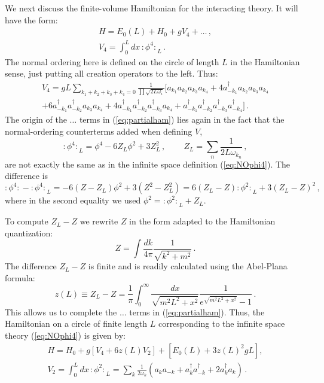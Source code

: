 \documentclass[11pt]{article}
\newcommand{\reef}[1]{(\ref{#1})}
\newcommand{\beq}{\begin{equation}}
\newcommand{\eeq}{\end{equation}}
\newcommand{\NO}[1]{{:\!#1\!:}}
\numberwithin{equation}{section}
\begin{document}
We next discuss the finite-volume Hamiltonian for the interacting theory. It will have the form:
\begin{gather}
\label{eq:partialham}
H = E_0(L)+ H_0+ g V_4+\ldots\,,\\
V_4=\int_0^L dx\,\NO{\phi^4}_L\,. 
\end{gather}
The normal ordering here is defined on the circle of length $L$ in the Hamiltonian sense, just putting all creation operators to the left. Thus:
\begin{multline}
V_4 = g L \sum_{k_1+k_2+k_3+k_4=0} \frac{1}{\prod \sqrt{2 L \omega_i}}
\Big[ a_{k_1}a_{k_2}a_{k_3}a_{k_4} +
4 a^\dagger_{-k_1}a_{k_2}a_{k_3}a_{k_4} \\ +
6 a^\dagger_{-k_1}a^\dagger_{-k_2}a_{k_3}a_{k_4} 
 +4 a^\dagger_{-k_1}a^\dagger_{-k_2}a^\dagger_{-k_3}a_{k_4} 
+ a^\dagger_{-k_1}a^\dagger_{-k_2}a^\dagger_{-k_3}a^\dagger_{-k_4} 
\Big]\,.
\end{multline}
The origin of the $\ldots$ terms in \reef{eq:partialham} lies again in the fact that the normal-ordering counterterms added when defining $V$, 
\beq
\NO{\phi^4}_L=\phi^4- 6 Z_L \phi^2 + 3 Z_L^2\,,\,\qquad Z_L=\sum_n \frac{1}{2L \omega_{k_n}}\,,
\eeq
are not exactly the same as in the infinite space definition \reef{eq:NOphi4}. The difference is
\beq
\NO{\phi^4}-\NO{\phi^4}_L=-6(Z-Z_L)\phi^2 +3(Z^2-Z_L^2)=6(Z_L-Z)\NO{\phi^2}_L +3(Z_L-Z)^2\,,
\eeq
where in the second equality we used $\phi^2=\NO{\phi^2}_L+Z_L$.

To compute $Z_L-Z$ we rewrite $Z$ in the form adapted to the Hamiltonian quantization:
\beq
Z=\int \frac{dk}{4\pi}\frac{1}{\sqrt{k^2+m^2}} \,.
\eeq
The difference $Z_L-Z$ is finite and is readily calculated using the Abel-Plana formula:
\beq
z(L)\equiv Z_L-Z=\frac{1}{\pi }\int_0^\infty \frac{dx}{\sqrt{m^2L^2+x^2}}\frac{1}{e^{\sqrt{m^2L^2+x^2}}-1}\, .
\eeq
This allows us to complete the $\ldots$ terms in \reef{eq:partialham}. Thus, the Hamiltonian on a circle of finite length $L$ corresponding to the infinite space theory \reef{eq:NOphi4} is given by:
\begin{gather}
\label{eq:ham}
H = H_0+ g[V_4+ 6 z(L) V_2]+ [E_0(L)+3 z(L)^2 g L],\\
V_2=\int_0^L dx\,\NO{\phi^2}_L=\sum_k \frac{1}{2 \omega_k}( a_k a_{-k} + a^\dagger_k a^\dagger_{-k} +2 a^\dagger_k a_k)\,. 
\end{gather}
\end{document}
